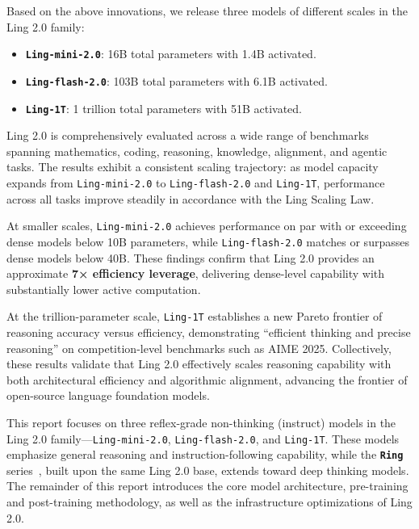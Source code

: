 \documentclass[table]{gtech}
\theoremstyle{definition}
\begin{document}
Based on the above innovations, we release three models of different scales in the Ling 2.0 family:
\begin{itemize}
    \item \texttt{\textbf{Ling-mini-2.0}}: 16B total parameters with 1.4B activated.
    \item \texttt{\textbf{Ling-flash-2.0}}: 103B total parameters with 6.1B activated.
    \item \texttt{\textbf{Ling-1T}}: 1 trillion total parameters with 51B activated.
\end{itemize}

Ling 2.0 is comprehensively evaluated across a wide range of benchmarks spanning mathematics, coding, reasoning, knowledge, alignment, and agentic tasks. The results exhibit a consistent scaling trajectory: as model capacity expands from \texttt{Ling-mini-2.0} to \texttt{Ling-flash-2.0} and \texttt{Ling-1T}, performance across all tasks improve steadily in accordance with the Ling Scaling Law.  

At smaller scales, \texttt{Ling-mini-2.0} achieves performance on par with or exceeding dense models below 10B parameters, while \texttt{Ling-flash-2.0} matches or surpasses dense models below 40B. These findings confirm that Ling 2.0 provides an approximate \textbf{7× efficiency leverage}, delivering dense-level capability with substantially lower active computation.  

At the trillion-parameter scale, \texttt{Ling-1T} establishes a new Pareto frontier of reasoning accuracy versus efficiency, demonstrating “efficient thinking and precise reasoning” on competition-level benchmarks such as AIME 2025. Collectively, these results validate that Ling 2.0 effectively scales reasoning capability with both architectural efficiency and algorithmic alignment, advancing the frontier of open-source language foundation models.

This report focuses on three reflex-grade non-thinking (instruct) models in the Ling 2.0 family—\texttt{Ling-mini-2.0}, \texttt{Ling-flash-2.0}, and \texttt{Ling-1T}. 
These models emphasize general reasoning and instruction-following capability, while the \texttt{\textbf{Ring}} series~\citep{lingteam2025stepevolvesscalingreinforcement}, built upon the same Ling 2.0 base, extends toward deep thinking models.
The remainder of this report introduces the core model architecture, pre-training and post-training methodology, as well as the infrastructure optimizations of Ling 2.0.
\end{document}

